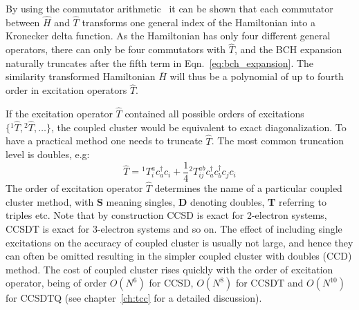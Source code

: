 By using the commutator arithmetic~\cite{shavitt2009many} it can be shown that 
each commutator between $\hat{H}$ and $\hat{T}$ transforms one general index 
of the Hamiltonian into a Kronecker delta function. As the Hamiltonian has only 
four different general operators, there can only be four commutators with 
$\hat{T}$, and the BCH expansion naturally truncates after the fifth term in 
Eqn.~\ref{eq:bch_expansion}. The similarity transformed Hamiltonian $\bar{H}$ 
will thus be a polynomial of up to fourth order in excitation operators 
$\hat{T}$.

If the excitation operator $\hat{T}$ contained all possible orders of 
excitations~$\{ {}^{1}\hat{T}, {}^{2}\hat{T}, \ldots \}$, 
the coupled cluster would be equivalent to exact diagonalization. To have a 
practical method one needs to truncate $\hat{T}$. The most common 
truncation level is doubles, e.g:
%
\begin{equation}
 \hat{T} =  {}^{1}T_{i}^{a} c^{\dagger}_{a} c_{i} + \frac{1}{4} {}^2T_{ij}^{ab} 
c^{\dagger}_{a} c^{\dagger}_{b} c_{j} c_{i}
\end{equation}
%
The order of excitation operator $\hat{T}$ determines the name of a particular 
coupled cluster method, with \textbf{S} meaning singles, \textbf{D} denoting 
doubles, \textbf{T} referring to triples etc. Note that by construction CCSD is 
exact for 2-electron systems, CCSDT is exact for 3-electron systems and so on. 
The effect of including single excitations on the accuracy of coupled cluster 
is usually not large, and hence they can often be omitted resulting in the 
simpler coupled cluster with doubles (CCD) method. The cost of coupled cluster 
rises quickly with the order of excitation operator, being of order $O(N^6)$ 
for CCSD, $O(N^8)$ for CCSDT and $O(N^{10})$ for CCSDTQ (see 
chapter~\ref{ch:tcc} for a detailed discussion).

